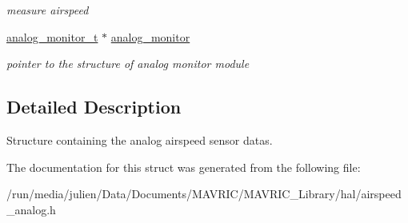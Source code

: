 \begin{DoxyCompactItemize}
\begin{DoxyCompactList}\small\item\em measure airspeed \end{DoxyCompactList}\item 
\hypertarget{structairspeed__analog__t_a26fdd36b9d0105b0bbbfd9222bb313ee}{\hyperlink{structanalog__monitor__t}{analog\+\_\+monitor\+\_\+t} $\ast$ \hyperlink{structairspeed__analog__t_a26fdd36b9d0105b0bbbfd9222bb313ee}{analog\+\_\+monitor}}\label{structairspeed__analog__t_a26fdd36b9d0105b0bbbfd9222bb313ee}

\begin{DoxyCompactList}\small\item\em pointer to the structure of analog monitor module \end{DoxyCompactList}\end{DoxyCompactItemize}


\subsection{Detailed Description}
Structure containing the analog airspeed sensor datas. 

The documentation for this struct was generated from the following file\+:\begin{DoxyCompactItemize}
\item 
/run/media/julien/\+Data/\+Documents/\+M\+A\+V\+R\+I\+C/\+M\+A\+V\+R\+I\+C\+\_\+\+Library/hal/airspeed\+\_\+analog.\+h\end{DoxyCompactItemize}
